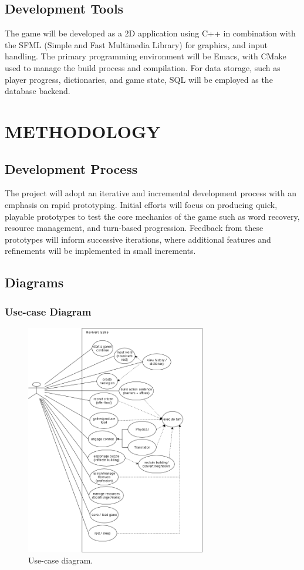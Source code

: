 \documentclass[11pt]{article}
\begin{document}
\subsection{Development Tools}
The game will be developed as a 2D application using C++ in combination with the SFML (Simple and Fast Multimedia Library) for graphics, and input handling.  
The primary programming environment will be Emacs, with CMake used to manage the build process and compilation.  
For data storage, such as player progress, dictionaries, and game state, SQL will be employed as the database backend.


\section{METHODOLOGY}
\subsection{Development Process}
The project will adopt an iterative and incremental development process with an emphasis on rapid prototyping. 
Initial efforts will focus on producing quick, playable prototypes to test the core mechanics of the game such as word recovery, resource management, and turn-based progression. 
Feedback from these prototypes will inform successive iterations, where additional features and refinements will be implemented in small increments.\\

\subsection{Diagrams}
\subsubsection{Use-case Diagram}

\begin{figure}[H]
  \centering
  \includegraphics[width=0.7\textwidth]{../images/usecase.png}
  \caption{Use-case diagram.}
  \label{fig:usecase}
\end{figure}
\end{document}
